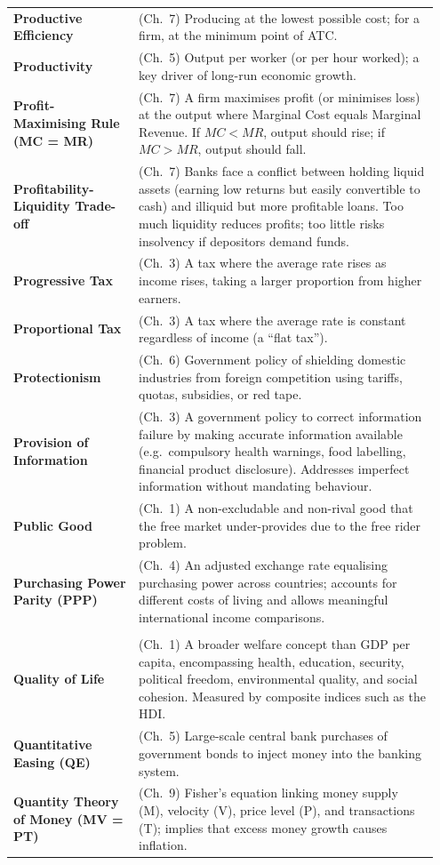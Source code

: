 \documentclass[11pt, a4paper, twoside]{book}
\begin{document}
\begin{longtable}{@{}>{\RaggedRight\arraybackslash}p{0.28\linewidth}>{\RaggedRight\arraybackslash}p{0.67\linewidth}@{}}
\textbf{Productive Efficiency} & (Ch.~7) Producing at the lowest possible cost; for a firm, at the minimum point of ATC. \\
\textbf{Productivity} & (Ch.~5) Output per worker (or per hour worked); a key driver of long-run economic growth. \\
\textbf{Profit-Maximising Rule (MC = MR)} & (Ch.~7) A firm maximises profit (or minimises loss) at the output where Marginal Cost equals Marginal Revenue. If $MC < MR$, output should rise; if $MC > MR$, output should fall. \\
\textbf{Profitability-Liquidity Trade-off} & (Ch.~7) Banks face a conflict between holding liquid assets (earning low returns but easily convertible to cash) and illiquid but more profitable loans. Too much liquidity reduces profits; too little risks insolvency if depositors demand funds. \\
\textbf{Progressive Tax} & (Ch.~3) A tax where the average rate rises as income rises, taking a larger proportion from higher earners. \\
\textbf{Proportional Tax} & (Ch.~3) A tax where the average rate is constant regardless of income (a ``flat tax''). \\
\textbf{Protectionism} & (Ch.~6) Government policy of shielding domestic industries from foreign competition using tariffs, quotas, subsidies, or red tape. \\
\textbf{Provision of Information} & (Ch.~3) A government policy to correct information failure by making accurate information available (e.g.\ compulsory health warnings, food labelling, financial product disclosure). Addresses imperfect information without mandating behaviour. \\
\textbf{Public Good} & (Ch.~1) A non-excludable and non-rival good that the free market under-provides due to the free rider problem. \\
\textbf{Purchasing Power Parity (PPP)} & (Ch.~4) An adjusted exchange rate equalising purchasing power across countries; accounts for different costs of living and allows meaningful international income comparisons. \\

\multicolumn{2}{@{}l}{\textbf{\Large\color{CurveNavy} Q}} \\[2pt]
\textbf{Quality of Life} & (Ch.~1) A broader welfare concept than GDP per capita, encompassing health, education, security, political freedom, environmental quality, and social cohesion. Measured by composite indices such as the HDI. \\
\textbf{Quantitative Easing (QE)} & (Ch.~5) Large-scale central bank purchases of government bonds to inject money into the banking system. \\
\textbf{Quantity Theory of Money (MV = PT)} & (Ch.~9) Fisher's equation linking money supply (M), velocity (V), price level (P), and transactions (T); implies that excess money growth causes inflation. \\


\end{longtable}
\end{document}
